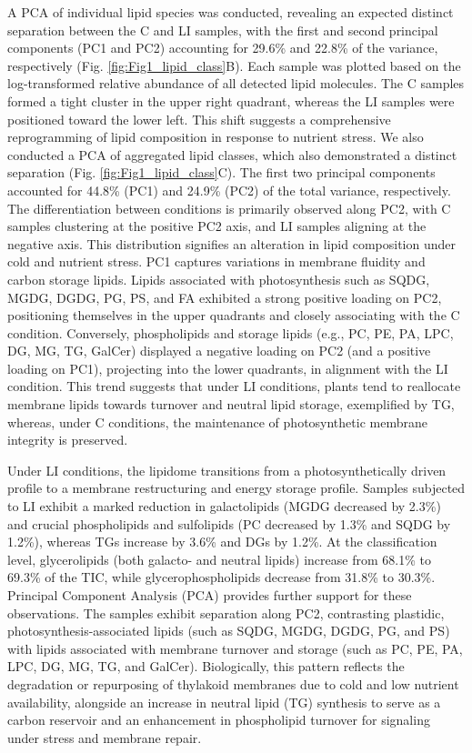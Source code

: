 \documentclass[10pt,letterpaper]{article}
\begin{document}
A PCA of individual lipid species was conducted, revealing an expected distinct separation between the C and LI samples, with the first and second principal components (PC1 and PC2) accounting for 29.6\% and 22.8\% of the variance, respectively (Fig. \ref{fig:Fig1_lipid_class}B). Each sample was plotted based on the log-transformed relative abundance of all detected lipid molecules. The C samples formed a tight cluster in the upper right quadrant, whereas the LI samples were positioned toward the lower left. This shift suggests a comprehensive reprogramming of lipid composition in response to nutrient stress. We also conducted a PCA of aggregated lipid classes, which also demonstrated a distinct separation (Fig. \ref{fig:Fig1_lipid_class}C). The first two principal components accounted for 44.8\% (PC1) and 24.9\% (PC2) of the total variance, respectively. The differentiation between conditions is primarily observed along PC2, with C samples clustering at the positive PC2 axis, and LI samples aligning at the negative axis. This distribution signifies an alteration in lipid composition under cold and nutrient stress. PC1 captures variations in membrane fluidity and carbon storage lipids. Lipids associated with photosynthesis such as SQDG, MGDG, DGDG, PG, PS, and FA exhibited a strong positive loading on PC2, positioning themselves in the upper quadrants and closely associating with the C condition. Conversely, phospholipids and storage lipids (e.g., PC, PE, PA, LPC, DG, MG, TG, GalCer) displayed a negative loading on PC2 (and a positive loading on PC1), projecting into the lower quadrants, in alignment with the LI condition. This trend suggests that under LI conditions, plants tend to reallocate membrane lipids towards turnover and neutral lipid storage, exemplified by TG, whereas, under C conditions, the maintenance of photosynthetic membrane integrity is preserved.

Under LI conditions, the lipidome transitions from a photosynthetically driven profile to a membrane restructuring and energy storage profile. Samples subjected to LI exhibit a marked reduction in galactolipids (MGDG decreased by 2.3\%) and crucial phospholipids and sulfolipids (PC decreased by 1.3\% and SQDG by 1.2\%), whereas TGs increase by 3.6\% and DGs by 1.2\%. At the classification level, glycerolipids (both galacto- and neutral lipids) increase from 68.1\% to 69.3\% of the TIC, while glycerophospholipids decrease from 31.8\% to 30.3\%. Principal Component Analysis (PCA) provides further support for these observations. The samples exhibit separation along PC2, contrasting plastidic, photosynthesis-associated lipids (such as SQDG, MGDG, DGDG, PG, and PS) with lipids associated with membrane turnover and storage (such as PC, PE, PA, LPC, DG, MG, TG, and GalCer). Biologically, this pattern reflects the degradation or repurposing of thylakoid membranes due to cold and low nutrient availability, alongside an increase in neutral lipid (TG) synthesis to serve as a carbon reservoir and an enhancement in phospholipid turnover for signaling under stress and membrane repair.
\end{document}

